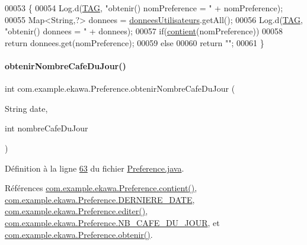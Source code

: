 \begin{DoxyCode}
00053     \{
00054         Log.d(\hyperlink{classcom_1_1example_1_1ekawa_1_1_preference_aeb5e1e787153c37929839622ac5d0339}{TAG}, \textcolor{stringliteral}{"obtenir() nomPreference = "} + nomPreference);
00055         Map<String,?> donnees = \hyperlink{classcom_1_1example_1_1ekawa_1_1_preference_a5ac49439bd1c8c3ff12dd9eb2475b894}{donneesUtilisateurs}.getAll();
00056         Log.d(\hyperlink{classcom_1_1example_1_1ekawa_1_1_preference_aeb5e1e787153c37929839622ac5d0339}{TAG}, \textcolor{stringliteral}{"obtenir() donnees = "} + donnees);
00057         \textcolor{keywordflow}{if}(\hyperlink{classcom_1_1example_1_1ekawa_1_1_preference_a25b7a4cfcc9fe5f9258471ce454a718a}{contient}(nomPreference))
00058             \textcolor{keywordflow}{return} donnees.get(nomPreference);
00059         \textcolor{keywordflow}{else}
00060             \textcolor{keywordflow}{return} \textcolor{stringliteral}{""};
00061     \}
\end{DoxyCode}
\mbox{\label{classcom_1_1example_1_1ekawa_1_1_preference_a5a8f4c9f845924a0ebb3aec5ca99a5f5}} 
\paragraph{\texorpdfstring{obtenir\+Nombre\+Cafe\+Du\+Jour()}{obtenirNombreCafeDuJour()}}
{\footnotesize\ttfamily int com.\+example.\+ekawa.\+Preference.\+obtenir\+Nombre\+Cafe\+Du\+Jour (\begin{DoxyParamCaption}\item[{String}]{date,  }\item[{int}]{nombre\+Cafe\+Du\+Jour }\end{DoxyParamCaption})}



Définition à la ligne \hyperlink{_preference_8java_source_l00063}{63} du fichier \hyperlink{_preference_8java_source}{Preference.\+java}.



Références \hyperlink{_preference_8java_source_l00087}{com.\+example.\+ekawa.\+Preference.\+contient()}, \hyperlink{_preference_8java_source_l00033}{com.\+example.\+ekawa.\+Preference.\+D\+E\+R\+N\+I\+E\+R\+E\+\_\+\+D\+A\+TE}, \hyperlink{_preference_8java_source_l00100}{com.\+example.\+ekawa.\+Preference.\+editer()}, \hyperlink{_preference_8java_source_l00034}{com.\+example.\+ekawa.\+Preference.\+N\+B\+\_\+\+C\+A\+F\+E\+\_\+\+D\+U\+\_\+\+J\+O\+UR}, et \hyperlink{_preference_8java_source_l00052}{com.\+example.\+ekawa.\+Preference.\+obtenir()}.



